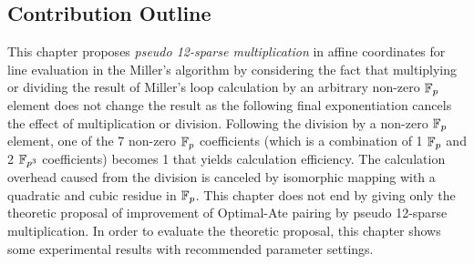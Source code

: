 \subsection{Contribution Outline}
\label{sec:ch:icisc:contriv_outline}
 This chapter proposes \textit{pseudo 12-sparse multiplication} in affine coordinates for line evaluation in the Miller's algorithm by considering the fact that multiplying or dividing the result of Miller's loop calculation by an arbitrary non-zero ${\mathbb{F}}_{p}$ element does not change the result as the following final exponentiation cancels the effect of multiplication or division. 
Following the division by a non-zero ${\mathbb{F}}_{p}$ element, one of the 7 non-zero ${\mathbb{F}}_{p}$ coefficients (which is a combination of 1 ${\mathbb{F}}_{p}$ and 2 $\mathbb{F}_{p^3}$ coefficients) becomes 1 that yields calculation efficiency.
The calculation overhead caused from the division is canceled by isomorphic mapping with a quadratic and cubic residue in ${\mathbb{F}}_{p}$.
This chapter does not end by giving only the theoretic proposal of improvement of Optimal-Ate pairing by pseudo 12-sparse multiplication.
In order to evaluate the theoretic proposal, this chapter shows some experimental results with recommended parameter settings. 

